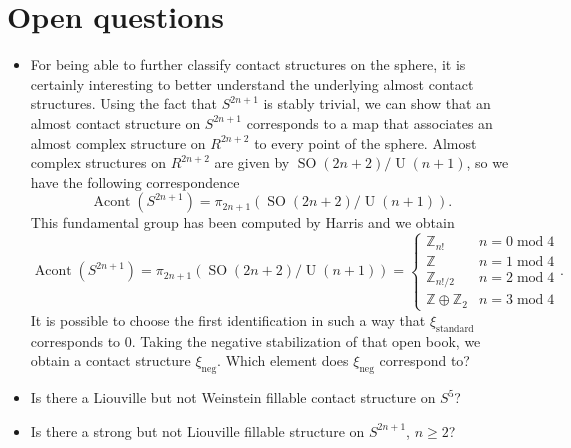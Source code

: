 \documentclass{amsart}
\begin{document}
\section*{Open questions}
\begin{itemize}
    \item For being able to further classify contact structures on the sphere, it is certainly interesting to better understand the underlying almost contact structures.
    Using the fact that $S^{2n+1}$ is stably trivial, we can show that an almost contact structure on $S^{2n+1}$ corresponds to a map that associates an almost complex structure on $R^{2n+2}$
    to every point of the sphere.
    Almost complex structures on $R^{2n+2}$ are given by $\operatorname{SO}(2n + 2)/\operatorname{U}(n + 1)$, so we have the following correspondence
    \[
        \operatorname{Acont}\left(S^{2n+1}\right) = \pi_{2n+1}(\operatorname{SO}(2n + 2)/\operatorname{U}(n + 1)).
    \]
    This fundamental group has been computed by Harris \cite{Harris63} and we obtain
    \[
        \operatorname{Acont}\left(S^{2n+1}\right) = \pi_{2n+1}(\operatorname{SO}(2n + 2)/\operatorname{U}(n + 1)) = \begin{cases}
            \mathbb Z_{n!} &n = 0 \operatorname{mod} 4\\
            \mathbb Z &n = 1 \operatorname{mod} 4\\
            \mathbb Z_{n!/2} &n = 2 \operatorname{mod} 4\\
            \mathbb Z \oplus \mathbb Z_2 &n = 3 \operatorname{mod} 4
        \end{cases}.
    \]
    It is possible to choose the first identification in such a way that $\xi_{\mathrm{standard}}$ corresponds to $0$.
    Taking the negative stabilization of that open book, we obtain a contact structure $\xi_\mathrm{neg}$. Which element does $\xi_\mathrm{neg}$ correspond to?
    \item Is there a Liouville but not Weinstein fillable contact structure on $S^5$? 
    \item Is there a strong but not Liouville fillable structure on $S^{2n+1}$, $n \ge 2$?
\end{itemize}
\newpage
\nocite{*}


\end{document}
